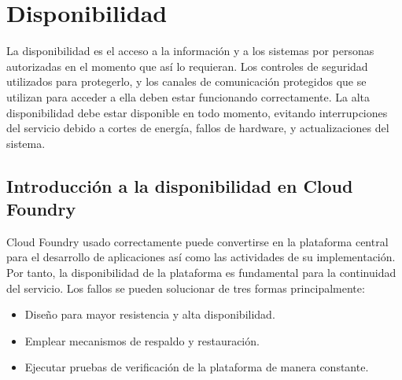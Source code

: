 \documentclass[a4paper,11pt]{article}
\begin{document}
\section{Disponibilidad}%

La disponibilidad es el acceso a la información y a los sistemas por personas autorizadas en el momento que así lo requieran. Los controles de seguridad utilizados para protegerlo, y los canales de comunicación protegidos que se utilizan para acceder a ella deben estar funcionando correctamente. La alta disponibilidad debe estar disponible en todo momento, evitando interrupciones del servicio debido a cortes de energía, fallos de hardware, y actualizaciones del sistema.
\subsection{Introducción a la disponibilidad en Cloud Foundry}
Cloud Foundry usado correctamente puede convertirse en la plataforma central para el desarrollo de aplicaciones así como las actividades de su implementación. Por tanto, la disponibilidad de la plataforma es fundamental para la continuidad del servicio. Los fallos se
pueden solucionar de tres formas principalmente:
\begin{itemize}
  \item Diseño para mayor resistencia y alta disponibilidad.
  \item Emplear mecanismos de respaldo y restauración.
  \item Ejecutar pruebas de verificación de la plataforma de manera constante.
\end{itemize}
\end{document}
